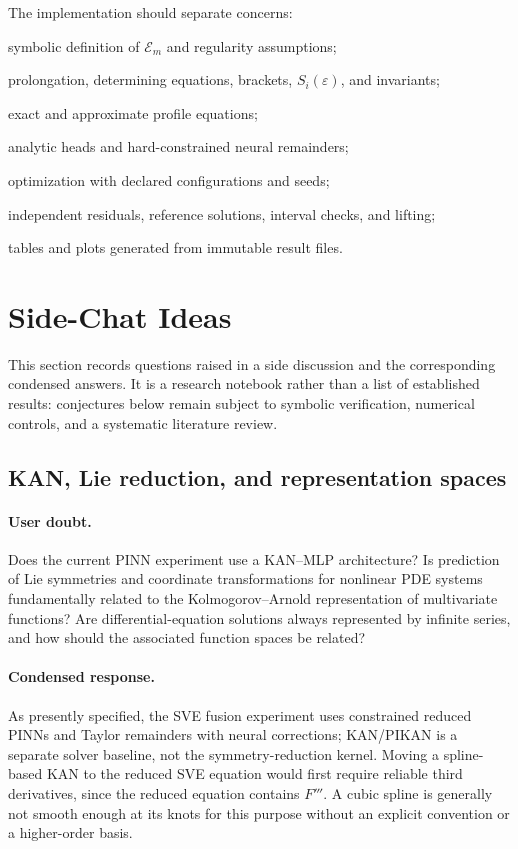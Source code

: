 \documentclass[11pt]{article}
\newcommand{\E}{\mathcal E}
\newcommand{\eps}{\varepsilon}
\begin{document}
The implementation should separate concerns:
\begin{description}[style=nextline]
\item[\texttt{model.py}] symbolic definition of $\E_m$ and regularity assumptions;
\item[\texttt{symmetry.py}] prolongation, determining equations, brackets, $S_i(\eps)$, and invariants;
\item[\texttt{reduction.py}] exact and approximate profile equations;
\item[\texttt{trial.py}] analytic heads and hard-constrained neural remainders;
\item[\texttt{train.py}] optimization with declared configurations and seeds;
\item[\texttt{verify.py}] independent residuals, reference solutions, interval checks, and lifting;
\item[\texttt{report.py}] tables and plots generated from immutable result files.
\end{description}

\section{Side-Chat Ideas}
\label{sec:side-chat-ideas}

This section records questions raised in a side discussion and the corresponding
condensed answers.  It is a research notebook rather than a list of established
results: conjectures below remain subject to symbolic verification, numerical
controls, and a systematic literature review.

\subsection{KAN, Lie reduction, and representation spaces}

\paragraph{User doubt.}
Does the current PINN experiment use a KAN--MLP architecture?  Is prediction of
Lie symmetries and coordinate transformations for nonlinear PDE systems
fundamentally related to the Kolmogorov--Arnold representation of multivariate
functions?  Are differential-equation solutions always represented by infinite
series, and how should the associated function spaces be related?

\paragraph{Condensed response.}
As presently specified, the SVE fusion experiment uses constrained reduced
PINNs and Taylor remainders with neural corrections; KAN/PIKAN is a separate solver baseline,
not the symmetry-reduction kernel.  Moving a spline-based KAN to the reduced SVE
equation would first require reliable third derivatives, since the reduced
equation contains $F'''$.  A cubic spline is generally not smooth enough at its
knots for this purpose without an explicit convention or a higher-order basis.
\end{document}
